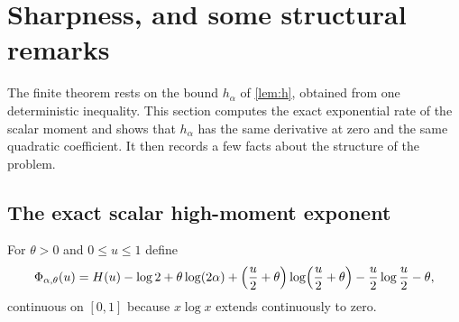 \section{Sharpness, and some structural remarks}
\label{sec:sharp}

The finite theorem rests on the bound $h_\alpha$ of \cref{lem:h}, obtained from one deterministic inequality. This section computes the exact exponential rate of the scalar moment and shows that $h_\alpha$ has the same derivative at zero and the same quadratic coefficient. It then records a few facts about the structure of the problem.

\subsection{The exact scalar high-moment exponent}

For $\theta>0$ and $0\le u\le1$ define
\begin{equation}\label{eq:Phi}
\Phi_{\alpha,\theta}(u)=H(u)-\log2+\theta\log(2\alpha)+\Bigl(\frac u2+\theta\Bigr)\log\Bigl(\frac u2+\theta\Bigr)-\frac u2\log\frac u2-\theta,
\end{equation}
continuous on $[0,1]$ because $x\log x$ extends continuously to zero.

